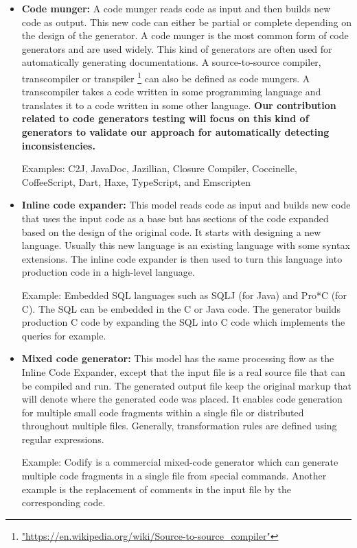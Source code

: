 \begin{itemize}
\item \textbf{Code munger:} A code munger reads code as input and then builds new code as output. This new code can either be partial or complete depending on the design of the generator.
A code munger is the most common form of code generators and are used widely. This kind of generators are often used for automatically generating documentations.
A source-to-source compiler, transcompiler or transpiler \footnote{\url{"https://en.wikipedia.org/wiki/Source-to-source_compiler"}} can also be defined as code mungers. A transcompiler takes a code written in some programming language and translates it to a code written in some other language. \textbf{Our contribution related to code generators testing will focus on this kind of generators to validate our approach for automatically detecting inconsistencies.}

Examples:  C2J, JavaDoc, Jazillian, Closure Compiler, Coccinelle, CoffeeScript, Dart, Haxe, TypeScript, and Emscripten



\item \textbf{Inline code expander:} This model reads code as input and builds new code that uses the input code as a base but has sections of the code expanded based on the design of the original code. 
It starts with designing a new language. Usually this new language is an existing language with some syntax extensions. The inline code expander is then used to turn this language into production code in a high-level language.

Example: Embedded SQL languages such as SQLJ (for Java) and Pro*C (for C). The SQL can be embedded in the C or Java code. The generator builds production C code by expanding the SQL into C code which implements the queries for example.

\item \textbf{Mixed code generator:} This model has the same processing flow as the Inline Code Expander, except that the input file is a real source file that can be compiled and run. The generated output file keep the original markup that will denote where the generated code was placed. It enables code generation for multiple small code fragments within a single file or distributed throughout multiple files. Generally, transformation rules are defined using regular expressions.


Example: Codify is a commercial mixed-code generator which can generate multiple code fragments in a single file from special commands. Another example is the replacement of comments in the input file by the corresponding code.


\end{itemize}
